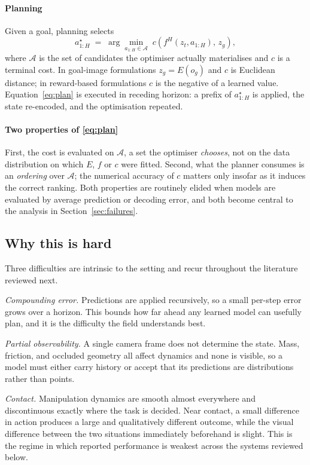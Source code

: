 \documentclass[11pt,letterpaper]{article}
\begin{document}
\paragraph{Planning}
Given a goal, planning selects
\begin{equation}\label{eq:plan}
  a_{1:H}^{\star} \;=\; \arg\min_{a_{1:H} \in \mathcal{A}}
  \; c\!\left(f^{H}(z_t, a_{1:H}),\, z_g\right),
\end{equation}
where $\mathcal{A}$ is the set of candidates the optimiser actually
materialises and $c$ is a terminal cost. In goal-image formulations $z_g =
E(o_g)$ and $c$ is Euclidean distance; in reward-based formulations $c$ is the
negative of a learned value. Equation~\eqref{eq:plan} is executed in receding
horizon: a prefix of $a^{\star}_{1:H}$ is applied, the state re-encoded, and the
optimisation repeated.

\paragraph{Two properties of \eqref{eq:plan}}
First, the cost is evaluated on $\mathcal{A}$, a set the optimiser
\emph{chooses}, not on the data distribution on which $E$, $f$ or $c$ were
fitted. Second, what the planner consumes is an \emph{ordering} over
$\mathcal{A}$; the numerical accuracy of $c$ matters only insofar as it induces
the correct ranking. Both properties are routinely elided when models are
evaluated by average prediction or decoding error, and both become central to
the analysis in Section~\ref{sec:failures}.

\subsection{Why this is hard}

Three difficulties are intrinsic to the setting and recur throughout the
literature reviewed next.

\emph{Compounding error.} Predictions are applied recursively, so a small
per-step error grows over a horizon. This bounds how far ahead any learned model
can usefully plan, and it is the difficulty the field understands best.

\emph{Partial observability.} A single camera frame does not determine the
state. Mass, friction, and occluded geometry all affect dynamics and none is
visible, so a model must either carry history or accept that its predictions are
distributions rather than points.

\emph{Contact.} Manipulation dynamics are smooth almost everywhere and
discontinuous exactly where the task is decided. Near contact, a small difference
in action produces a large and qualitatively different outcome, while the visual
difference between the two situations immediately beforehand is slight. This is
the regime in which reported performance is weakest across the systems reviewed
below.
\end{document}

